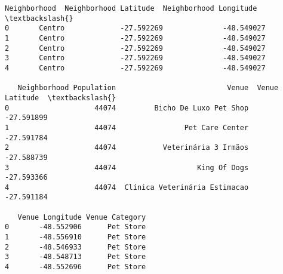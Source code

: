 \documentclass[11pt]{article}
\makeatletter
\newcommand{\boxspacing}{\kern\kvtcb@left@rule\kern\kvtcb@boxsep}
\newcommand{\prompt}[4]{
        \ttfamily\llap{{\color{#2}[#3]:\hspace{3pt}#4}}\vspace{-\baselineskip}
    }
\makeatother
\begin{document}
            \begin{tcolorbox}[breakable, size=fbox, boxrule=.5pt, pad at break*=1mm, opacityfill=0]
\prompt{Out}{outcolor}{12}{\boxspacing}
\begin{Verbatim}[commandchars=\\\{\}]
  Neighborhood  Neighborhood Latitude  Neighborhood Longitude  \textbackslash{}
0       Centro             -27.592269              -48.549027
1       Centro             -27.592269              -48.549027
2       Centro             -27.592269              -48.549027
3       Centro             -27.592269              -48.549027
4       Centro             -27.592269              -48.549027

   Neighborhood Population                          Venue  Venue Latitude  \textbackslash{}
0                    44074         Bicho De Luxo Pet Shop      -27.591899
1                    44074                Pet Care Center      -27.591784
2                    44074           Veterinária 3 Irmãos      -27.588739
3                    44074                   King Of Dogs      -27.593366
4                    44074  Clínica Veterinária Estimacao      -27.591184

   Venue Longitude Venue Category
0       -48.552906      Pet Store
1       -48.556910      Pet Store
2       -48.546933      Pet Store
3       -48.548713      Pet Store
4       -48.552696      Pet Store
\end{Verbatim}
\end{tcolorbox}
        
\end{document}

